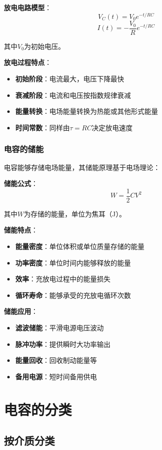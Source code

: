 \documentclass[12pt,UTF8]{ctexbook}
\begin{document}
\textbf{放电电路模型}：
\[ V_C(t) = V_0 e^{-t/RC} \]
\[ I(t) = -\frac{V_0}{R}e^{-t/RC} \]

其中$V_0$为初始电压。

\textbf{放电过程特点}：
\begin{itemize}[leftmargin=3.5em]
    \item \textbf{初始阶段}：电流最大，电压下降最快
    \item \textbf{衰减阶段}：电流和电压按指数规律衰减
    \item \textbf{能量转换}：电场能量转换为热能或其他形式能量
    \item \textbf{时间常数}：同样由$\tau = RC$决定放电速度
\end{itemize}

\subsection{电容的储能}

电容能够存储电场能量，其储能原理基于电场理论：

\textbf{储能公式}：
\[ W = \frac{1}{2}CV^2 \]

其中$W$为存储的能量，单位为焦耳（J）。

\textbf{储能特点}：
\begin{itemize}[leftmargin=3.5em]
    \item \textbf{能量密度}：单位体积或单位质量存储的能量
    \item \textbf{功率密度}：单位时间内能够释放的能量
    \item \textbf{效率}：充放电过程中的能量损失
    \item \textbf{循环寿命}：能够承受的充放电循环次数
\end{itemize}

\textbf{储能应用}：
\begin{itemize}[leftmargin=3.5em]
    \item \textbf{滤波储能}：平滑电源电压波动
    \item \textbf{脉冲功率}：提供瞬时大功率输出
    \item \textbf{能量回收}：回收制动能量等
    \item \textbf{备用电源}：短时间备用供电
\end{itemize}

\chapter{电容的分类}

\section{按介质分类}
\end{document}
